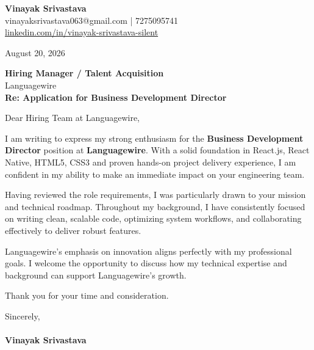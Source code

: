 \documentclass[11pt,a4paper]{article}
\begin{document}
\thispagestyle{empty}

{\Large \textbf{Vinayak Srivastava}}\\
vinayaksrivastava063@gmail.com | 7275095741 \\
\url{linkedin.com/in/vinayak-srivastava-silent}

\vspace{1em}
\hfill August 20, 2026

\textbf{Hiring Manager / Talent Acquisition}\\
Languagewire\\

\vspace{1.5em}
\textbf{Re: Application for Business Development Director}

\vspace{1em}
Dear Hiring Team at Languagewire,

I am writing to express my strong enthusiasm for the \textbf{Business Development Director} position at \textbf{Languagewire}. With a solid foundation in React.js, React Native, HTML5, CSS3 and proven hands-on project delivery experience, I am confident in my ability to make an immediate impact on your engineering team.

Having reviewed the role requirements, I was particularly drawn to your mission and technical roadmap. Throughout my background, I have consistently focused on writing clean, scalable code, optimizing system workflows, and collaborating effectively to deliver robust features.

Languagewire's emphasis on innovation aligns perfectly with my professional goals. I welcome the opportunity to discuss how my technical expertise and background can support Languagewire's growth.

Thank you for your time and consideration.

\vspace{1.5em}
Sincerely,\\
\vspace{1em}\\
\textbf{Vinayak Srivastava}
\end{document}
